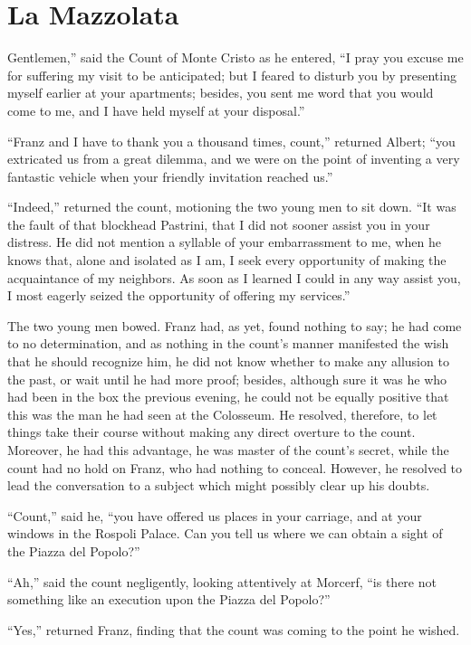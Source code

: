 \chapter{La Mazzolata}

Gentlemen,” said the Count of Monte Cristo as he entered, “I pray you
excuse me for suffering my visit to be anticipated; but I feared to
disturb you by presenting myself earlier at your apartments; besides,
you sent me word that you would come to me, and I have held myself at
your disposal.”

“Franz and I have to thank you a thousand times, count,” returned
Albert; “you extricated us from a great dilemma, and we were on the
point of inventing a very fantastic vehicle when your friendly
invitation reached us.”

“Indeed,” returned the count, motioning the two young men to sit down.
“It was the fault of that blockhead Pastrini, that I did not sooner
assist you in your distress. He did not mention a syllable of your
embarrassment to me, when he knows that, alone and isolated as I am, I
seek every opportunity of making the acquaintance of my neighbors. As
soon as I learned I could in any way assist you, I most eagerly seized
the opportunity of offering my services.”

The two young men bowed. Franz had, as yet, found nothing to say; he
had come to no determination, and as nothing in the count’s manner
manifested the wish that he should recognize him, he did not know
whether to make any allusion to the past, or wait until he had more
proof; besides, although sure it was he who had been in the box the
previous evening, he could not be equally positive that this was the
man he had seen at the Colosseum. He resolved, therefore, to let things
take their course without making any direct overture to the count.
Moreover, he had this advantage, he was master of the count’s secret,
while the count had no hold on Franz, who had nothing to conceal.
However, he resolved to lead the conversation to a subject which might
possibly clear up his doubts.

“Count,” said he, “you have offered us places in your carriage, and at
your windows in the Rospoli Palace. Can you tell us where we can obtain
a sight of the Piazza del Popolo?”

“Ah,” said the count negligently, looking attentively at Morcerf, “is
there not something like an execution upon the Piazza del Popolo?”

“Yes,” returned Franz, finding that the count was coming to the point
he wished.


